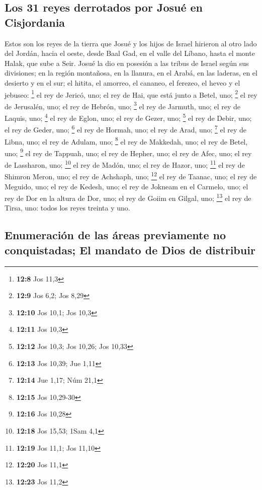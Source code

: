 \hypertarget{los-31-reyes-derrotados-por-josuuxe9-en-cisjordania}{%
\subsection{Los 31 reyes derrotados por Josué en
Cisjordania}\label{los-31-reyes-derrotados-por-josuuxe9-en-cisjordania}}

 Estos son los reyes de la tierra que Josué y los hijos de
Israel hirieron al otro lado del Jordán, hacia el oeste, desde Baal Gad,
en el valle del Líbano, hasta el monte Halak, que sube a Seir. Josué la
dio en posesión a las tribus de Israel según sus divisiones;
 en la región montañosa, en la llanura, en el Arabá, en
las laderas, en el desierto y en el sur; el hitita, el amorreo, el
cananeo, el ferezeo, el heveo y el jebuseo: \footnote{\textbf{12:8} Jos
  11,3}  el rey de Jericó, uno; el rey de Hai, que está
junto a Betel, uno; \footnote{\textbf{12:9} Jos 6,2; Jos 8,29}
 el rey de Jerusalén, uno; el rey de Hebrón, uno;
\footnote{\textbf{12:10} Jos 10,1; Jos 10,3}  el rey de
Jarmuth, uno; el rey de Laquis, uno; \footnote{\textbf{12:11} Jos 10,3}
 el rey de Eglon, uno; el rey de Gezer, uno; \footnote{\textbf{12:12}
  Jos 10,3; Jos 10,26; Jos 10,33}  el rey de Debir, uno;
el rey de Geder, uno; \footnote{\textbf{12:13} Jos 10,39; Jue 1,11}
 el rey de Hormah, uno; el rey de Arad, uno; \footnote{\textbf{12:14}
  Jue 1,17; Núm 21,1}  el rey de Libna, uno; el rey de
Adulam, uno; \footnote{\textbf{12:15} Jos 10,29-30}  el
rey de Makkedah, uno; el rey de Betel, uno; \footnote{\textbf{12:16} Jos
  10,28}  el rey de Tappuah, uno; el rey de Hepher, uno;
 el rey de Afec, uno; el rey de Lassharon, uno;
\footnote{\textbf{12:18} Jos 15,53; 1Sam 4,1}  el rey de
Madón, uno; el rey de Hazor, uno; \footnote{\textbf{12:19} Jos 11,1; Jos
  11,10}  el rey de Shimron Meron, uno; el rey de
Achshaph, uno; \footnote{\textbf{12:20} Jos 11,1}  el rey
de Taanac, uno; el rey de Meguido, uno;  el rey de
Kedesh, uno; el rey de Jokneam en el Carmelo, uno;  el
rey de Dor en la altura de Dor, uno; el rey de Goiim en Gilgal, uno;
\footnote{\textbf{12:23} Jos 11,2}  el rey de Tirsa, uno:
todos los reyes treinta y uno.

\hypertarget{enumeraciuxf3n-de-las-uxe1reas-previamente-no-conquistadas-el-mandato-de-dios-de-distribuir}{%
\subsection{Enumeración de las áreas previamente no conquistadas; El
mandato de Dios de
distribuir}\label{enumeraciuxf3n-de-las-uxe1reas-previamente-no-conquistadas-el-mandato-de-dios-de-distribuir}}

